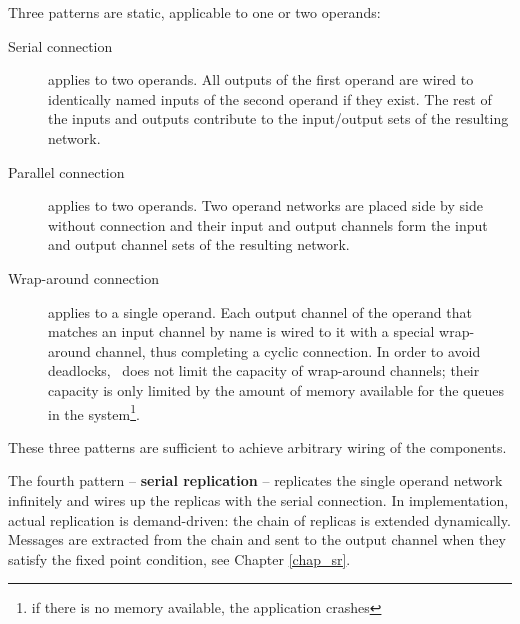 Three patterns are static, applicable to one or two operands:
\begin{description}
\item[Serial connection] applies to two operands. All outputs of the first operand are wired to identically named inputs of the second operand if they exist. The rest of the inputs and outputs contribute to the input/output sets of the resulting network.

\item[Parallel connection] applies to two operands. Two operand networks are placed side by side without connection and their input and output channels form the input and output channel sets of the resulting network.

\item[Wrap-around connection] applies to a single operand. Each output channel of the operand that matches an input channel by name is wired to it with a special wrap-around channel, thus completing a cyclic connection. In order to avoid deadlocks, \ak\ does not limit the capacity of wrap-around channels; their capacity is only limited by the amount of memory available for the queues in the system\footnote{if there is no memory available, the application crashes}.
\end{description}
These three patterns are sufficient to achieve arbitrary wiring of the components. %

The fourth pattern -- \textbf{serial replication} -- replicates the single operand network infinitely and wires up the replicas with the serial connection. In implementation, actual replication is demand-driven: the chain of replicas is extended dynamically. Messages are extracted from the chain and sent to the output channel when they satisfy the fixed point condition, see Chapter \ref{chap_sr}.


